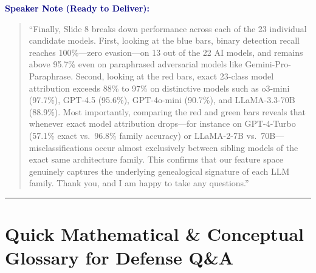 \documentclass[11pt, a4paper]{article}
\newenvironment{speakernote}{%
    \par\vspace{0.2cm}%
    \noindent\textbf{\textcolor{navy}{Speaker Note (Ready to Deliver):}}\par\vspace{0.1cm}%
    \begin{quote}\itshape\color{slate}%
}{%
    \end{quote}\vspace{0.2cm}%
}
\begin{document}
\begin{speakernote}
``Finally, Slide 8 breaks down performance across each of the 23 individual candidate models. First, looking at the blue bars, binary detection recall reaches 100\%---zero evasion---on 13 out of the 22 AI models, and remains above 95.7\% even on paraphrased adversarial models like Gemini-Pro-Paraphrase. Second, looking at the red bars, exact 23-class model attribution exceeds 88\% to 97\% on distinctive models such as o3-mini (97.7\%), GPT-4.5 (95.6\%), GPT-4o-mini (90.7\%), and LLaMA-3.3-70B (88.9\%). Most importantly, comparing the red and green bars reveals that whenever exact model attribution drops---for instance on GPT-4-Turbo (57.1\% exact vs.\ 96.8\% family accuracy) or LLaMA-2-7B vs.\ 70B---misclassifications occur almost exclusively between sibling models of the exact same architecture family. This confirms that our feature space genuinely captures the underlying genealogical signature of each LLM family. Thank you, and I am happy to take any questions.''
\end{speakernote}

\vspace{0.3cm}\hrule\vspace{0.3cm}

\section{Quick Mathematical \& Conceptual Glossary for Defense Q\&A}
\end{document}
